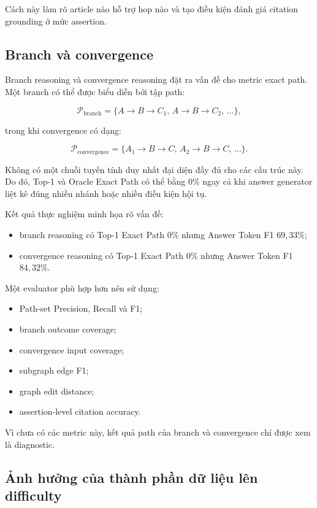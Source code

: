 Cách này làm rõ article nào hỗ trợ hop nào và tạo điều kiện đánh giá
citation grounding ở mức assertion.

\subsection{Branch và convergence}

Branch reasoning và convergence reasoning đặt ra vấn đề cho metric exact
path. Một branch có thể được biểu diễn bởi tập path:

\[
\mathcal{P}_{\mathrm{branch}}
=
\{
A \rightarrow B \rightarrow C_1,\,
A \rightarrow B \rightarrow C_2,\,
\ldots
\},
\]

trong khi convergence có dạng:

\[
\mathcal{P}_{\mathrm{convergence}}
=
\{
A_1 \rightarrow B \rightarrow C,\,
A_2 \rightarrow B \rightarrow C,\,
\ldots
\}.
\]

Không có một chuỗi tuyến tính duy nhất đại diện đầy đủ cho các cấu trúc này.
Do đó, Top-1 và Oracle Exact Path có thể bằng \(0\%\) ngay cả khi answer
generator liệt kê đúng nhiều nhánh hoặc nhiều điều kiện hội tụ.

Kết quả thực nghiệm minh họa rõ vấn đề:

\begin{itemize}
    \item branch reasoning có Top-1 Exact Path \(0\%\) nhưng Answer Token F1
    \(69{,}33\%\);

    \item convergence reasoning có Top-1 Exact Path \(0\%\) nhưng Answer
    Token F1 \(84{,}32\%\).
\end{itemize}

Một evaluator phù hợp hơn nên sử dụng:

\begin{itemize}
    \item Path-set Precision, Recall và F1;
    \item branch outcome coverage;
    \item convergence input coverage;
    \item subgraph edge F1;
    \item graph edit distance;
    \item assertion-level citation accuracy.
\end{itemize}

Vì chưa có các metric này, kết quả path của branch và convergence chỉ được
xem là diagnostic.

\subsection{Ảnh hưởng của thành phần dữ liệu lên difficulty}

